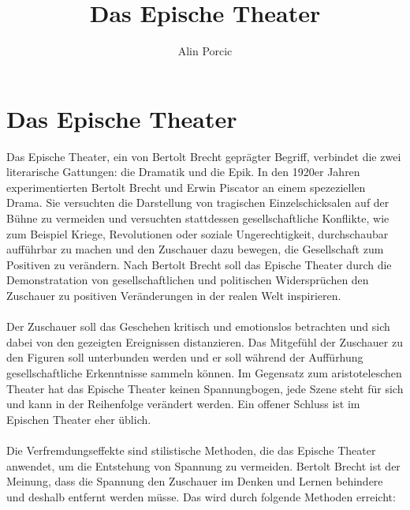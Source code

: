 \documentclass[a4paper]{article}
\title{Das Epische Theater}
\author{Alin Porcic}
\begin{document}
	\maketitle

	\newpage

	\section{Das Epische Theater}

        Das Epische Theater, ein von Bertolt Brecht geprägter Begriff, verbindet die zwei literarische Gattungen: die Dramatik und die Epik. In den 1920er Jahren experimentierten Bertolt Brecht und Erwin Piscator an einem spezeziellen  Drama. Sie versuchten die Darstellung von tragischen Einzelschicksalen auf der Bühne zu vermeiden und versuchten stattdessen gesellschaftliche Konflikte, wie zum Beispiel Kriege, Revolutionen oder soziale Ungerechtigkeit, durchschaubar aufführbar zu machen und den Zuschauer dazu bewegen, die Gesellschaft zum Positiven zu verändern. Nach Bertolt Brecht soll das Epische Theater durch die Demonstratation von gesellschaftlichen und politischen Widersprüchen den Zuschauer zu positiven Veränderungen in der realen Welt inspirieren.\\\\

        Der Zuschauer soll das Geschehen kritisch und emotionslos betrachten und sich dabei von den gezeigten Ereignissen distanzieren. Das Mitgefühl der Zuschauer zu den Figuren soll unterbunden werden und er soll während der Auffürhung gesellschaftliche Erkenntnisse sammeln können. Im Gegensatz zum aristoteleschen Theater hat das Epische Theater keinen Spannungbogen, jede Szene steht für sich und kann in der Reihenfolge verändert werden. Ein offener Schluss ist im Epischen Theater eher üblich.\\\\

	Die Verfremdungseffekte sind stilistische Methoden, die das Epische Theater anwendet, um die Entstehung von Spannung zu vermeiden. Bertolt Brecht ist der Meinung, dass die Spannung den Zuschauer im Denken und Lernen behindere und deshalb entfernt werden müsse. Das wird durch folgende Methoden erreicht:
        
\end{document}
